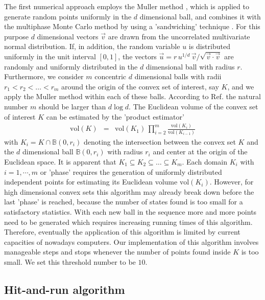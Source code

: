 \documentclass[12pt]{iopart}
\begin{document}
The first numerical approach employs the Muller method \cite{Muller59, BoxM,Harman}, which is applied to generate random points uniformly in the $d$ dimensional ball, 
and combines it with the multiphase Monte Carlo method by using a 'sandwiching' technique \cite{Kannan, Sim03}. For this purpose $d$ dimensional vectors $\vec{v}$ are drawn from the uncorrelated 
multivariate normal distribution.  If, in addition, the random variable $u$ is distributed uniformly in the unit interval $[0,1]$, 
the vectors $ \vec{u}=r\,u^{1/d}\, \vec{v}/\sqrt{\vec{v} \cdot \vec{v}}$ are randomly and uniformly 
distributed in the $d$ dimensional ball with radius $r$. Furthermore, we consider $m$ concentric 
$d$ dimensional balls with radii 
$r_1<r_2<\dots<r_m$ around the origin of the convex set of interest, say $K$, and we apply the Muller method within each of these balls. According to Ref. 
\cite{Sim03} the natural number $m$ should be larger than $d \log d$. The Euclidean volume of the convex set of interest $K$ can be estimated by the 'product estimator'
\begin{eqnarray}
\mbox{vol}(K) &=& \mbox{vol}(K_1)\,\displaystyle\prod_{i=2}^m\frac{\mbox{vol}(K_i)}{\mbox{vol}(K_{i-1})}
\end{eqnarray}
with
 $K_i = K\cap \mathbb{B}(0, r_i) $
denoting the intersection between the convex set $K$ and the $d$ dimensional ball $\mathbb{B}(0, r_i)$ with radius $r_i$ and center at the origin of the Euclidean space. 
It is apparent that $K_1\subseteq K_2 \subseteq \dots \subseteq K_m$. 
Each domain $K_i$ with $i=1,\cdots,m$ or 'phase'
requires the generation of uniformly distributed independent points for estimating its Euclidean volume $\mbox{vol}(K_i)$.  However, for high dimensional convex sets this algorithm may already break down before the last 'phase' is reached, because the number of states found is too small for a satisfactory statistics.
With each new ball in the sequence more and more points need to be generated which requires increasing running times of this algorithm. 
Therefore, eventually the application of this algorithm is limited by current capacities  of nowadays computers. 
Our implementation of this algorithm involves manageable steps and stops whenever the number of points found inside $K$ is too small. We set this threshold number to be $10$. 


\subsection{Hit-and-run algorithm}
\end{document}
